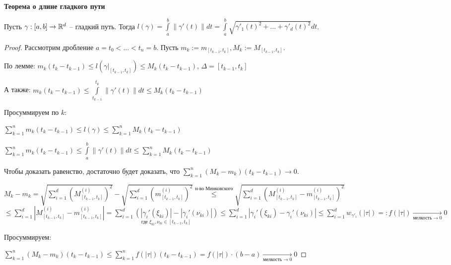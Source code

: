 \begin{theorem}
    \textbf{Теорема о длине гладкого пути}

    Пусть $\gamma:[a, b]\rightarrow \mathbb{R}^d$ – гладкий путь. Тогда $l(\gamma)=\int\limits_a^b\|\gamma'(t)\|dt=\int\limits_a^b\sqrt{\gamma'_1(t)^2+...+\gamma'_d(t)^2} dt$.
\end{theorem}

\begin{proof}
     Рассмотрим дробление $a=t_0< ... <t_n=b$. Пусть $m_k:=m_{[t_{k-1}, t_k]}, M_k:=M_{[t_{k-1}, t_k]}$.

     По лемме: $m_k(t_k-t_{k-1})\leq l(\gamma |_{[t_{k-1}, t_k]})\leq M_k(t_k-t_{k-1})$, $\Delta=[t_{k-1}, t_k]$

     А также: $m_k(t_k-t_{k-1})\leq \int\limits_{t_{k-1}}^{t_k}\|\gamma'(t)\|dt\leq M_k(t_k-t_{k-1})$

     Просуммируем по $k$: 
     
     $\sum\limits_{k=1}^nm_k(t_k-t_{k-1})\leq l(\gamma)\leq \sum\limits_{k=1}^nM_k(t_k-t_{k-1})$

     $\sum\limits_{k=1}^nm_k(t_k-t_{k-1})\leq \int\limits_a^b\|\gamma'(t)\|dt\leq \sum\limits_{k=1}^nM_k(t_k-t_{k-1})$

     Чтобы доказать равенство, достаточно будет доказать, что $\sum\limits_{k=1}^n(M_k-m_k)(t_k-t_{k-1})\rightarrow 0$.

     $M_k-m_k=\sqrt{\sum\limits_{i=1}^d(M^{(i)}_{[t_{k-1}, t_k]})^2}-\sqrt{\sum\limits_{i=1}^d(m^{(i)}_{[t_{k-1}, t_k]})^2}\overset{\text{н-во Минковского}}{\leq} \sqrt{\sum\limits_{i=1}^d(M^{(i)}_{[t_{k-1}, t_k]}-m^{(i)}_{[t_{k-1}, t_k]})^2}$ $\leq \sum\limits_{i=1}^d|M^{(i)}_{[t_{k-1}, t_k]}-m^{(i)}_{[t_{k-1}, t_k]}|=\underset{\text{где } \xi_{ki},\nu_{ki}\in[t_{k-1}, t_k]}{\sum\limits
     _{i=1}^d(|\gamma_i'(\xi_{ki})|-|\gamma_i'(\nu_{ki})|)}\leq \sum\limits_{i=1}^d|\gamma_i'(\xi_{ki})-\gamma_i'(\nu_{ki})|\leq \sum\limits_{i=1}^d w_{\gamma'_i}(|\tau|)=:f(|\tau|)\underset{\text{мелкость}\rightarrow 0}{\rightarrow}0$

     Просуммируем:

     $\sum\limits_{k=1}^n(M_k-m_k)(t_k-t_{k-1})\leq \sum\limits_{k=1}^n f(|\tau|)(t_k-t_{k-1})=f(|\tau|)\cdot (b-a)\underset{\text{мелкость}\rightarrow 0}{\rightarrow}0$
\end{proof}

